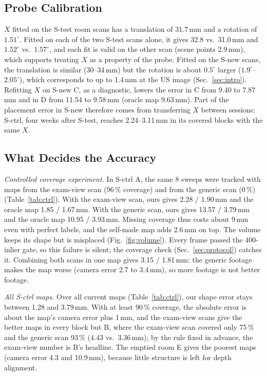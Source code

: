 \documentclass[journal]{IEEEtran}
\newcommand{\Stest}{S-test}
\newcommand{\Snew}{S-new}
\newcommand{\Sctrl}{S-ctrl}
\begin{document}
\subsection{Probe Calibration}
\label{sec:res_calib}
$X$ fitted on the \Stest{} room scans has a translation of 31.7\,mm and a rotation of $1.51^\circ$. Fitted on each of the two \Stest{} scans alone, it gives 32.8 vs.\ 31.0\,mm and $1.52^\circ$ vs.\ $1.57^\circ$, and each fit is valid on the other scan (scene points 2.9\,mm), which supports treating $X$ as a property of the probe. Fitted on the \Snew{} scans, the translation is similar (30--34\,mm) but the rotation is about $0.5^\circ$ larger ($1.9^\circ$--$2.05^\circ$), which corresponds to up to 1.4\,mm at the US image (Sec.~\ref{sec:intro}). Refitting $X$ on \Snew{} C, as a diagnostic, lowers the error in C from 9.40 to 7.87\,mm and in D from 11.54 to 9.58\,mm (oracle map 9.63\,mm). Part of the placement error in \Snew{} therefore comes from transferring $X$ between sessions; \Sctrl{}, four weeks after \Stest{}, reaches 2.24--3.11\,mm in its covered blocks with the same $X$.

\subsection{What Decides the Accuracy}
\label{sec:res_coverage}
\emph{Controlled coverage experiment.} In \Sctrl{} A, the same 8 sweeps were tracked with maps from the exam-view scan (96\,\% coverage) and from the generic scan (0\,\%) (Table~\ref{tab:ctrl}). With the exam-view scan, ours gives 2.28 / 1.90\,mm and the oracle map 1.85 / 1.67\,mm. With the generic scan, ours gives 13.57 / 3.79\,mm and the oracle map 10.95 / 3.93\,mm. Missing coverage thus costs about 9\,mm even with perfect labels, and the self-made map adds 2.6\,mm on top. The volume keeps its shape but is misplaced (Fig.~\ref{fig:volume}). Every frame passed the 400-inlier gate, so this failure is silent; the coverage check (Sec.~\ref{sec:protocol}) catches it. Combining both scans in one map gives 3.15 / 1.81\,mm: the generic footage makes the map worse (camera error 2.7 to 3.4\,mm), so more footage is not better footage.

\emph{All \Sctrl{} maps.} Over all current maps (Table~\ref{tab:ctrl}), our shape error stays between 1.28 and 3.79\,mm. With at least 90\,\% coverage, the absolute error is about the map's camera error plus 1\,mm, and the exam-view scans give the better maps in every block but B, where the exam-view scan covered only 75\,\% and the generic scan 93\,\% (4.43 vs.\ 3.36\,mm); by the rule fixed in advance, the exam-view number is B's headline. The emptied room E gives the poorest maps (camera error 4.3 and 10.9\,mm), because little structure is left for depth alignment.
\end{document}

